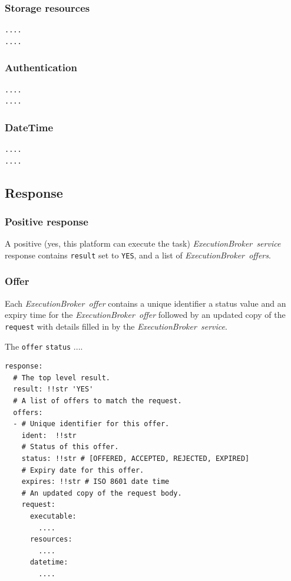 \documentclass[11pt,a4paper]{ivoa}
\newcommand{\execbrokerservice}[1] {\textit{ExecutionBroker~service#1}}
\newcommand{\execoffer}[1] {\textit{ExecutionBroker~offer#1}}
\newcommand{\codeword}[1] {\texttt{#1}}
\begin{document}
\subsubsection{Storage resources}
\label{datamodel-storage-resources}

\begin{lstlisting}[]
....
....
\end{lstlisting}

\subsubsection{Authentication}
\label{datamodel-authentication}

\begin{lstlisting}[]
....
....
\end{lstlisting}

\subsubsection{DateTime}
\label{datamodel-datetime}

\begin{lstlisting}[]
....
....
\end{lstlisting}

\subsection{Response}
\label{datamodel-response}

\subsubsection{Positive response}
\label{datamodel-positive-response}
A positive (yes, this platform can execute the task) \execbrokerservice{} response contains \codeword{result}
set to \codeword{YES}, and a list of \execoffer{s}.

\subsubsection{Offer}
\label{datamodel-offer}

Each \execoffer{} contains a unique identifier a status value and an expiry time for the \execoffer{}
followed by an updated copy of the \codeword{request} with details
filled in by the \execbrokerservice{}.

The \codeword{offer} \codeword{status} ....

\begin{lstlisting}[]
response:
  # The top level result.
  result: !!str 'YES'
  # A list of offers to match the request.
  offers:
  - # Unique identifier for this offer.
    ident:  !!str
    # Status of this offer.
    status: !!str # [OFFERED, ACCEPTED, REJECTED, EXPIRED]
    # Expiry date for this offer.
    expires: !!str # ISO 8601 date time
    # An updated copy of the request body.
    request:
      executable:
        ....
      resources:
        ....
      datetime:
        ....
\end{lstlisting}
\end{document}
